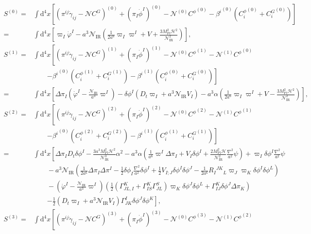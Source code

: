 \documentclass[aps, prd
, preprint
, nofootinbib 
, notitlepage
, longbibliography
]{revtex4-1}
\newcommand{\dd}{\mathrm{d}}
\newcommand{\Mpl}{M_\text{Pl}}
\newcommand{\IR}{\text{IR}}
\newcommand{\calH}{\mathcal{H}}
\newcommand{\calN}{\mathcal{N}}
\newcommand{\dphi}{\delta\phi}
\newcommand{\Dpi}{\Delta\pi}
\newcommand{\bae}[1]{\begin{align} #1 \end{align}}
\begin{document}
\bae{
	S^{(0)} =& \int\dd^4x\left[(\pi^{ij}\dot{\gamma}_{ij}-\calN C^G)^{(0)}+(\pi_I\dot{\phi}^I)^{(0)}-\calN^{(0)}{C^\phi}^{(0)}
	-{\beta^i}^{(0)}({C_i^\phi}^{(0)}+{C_i^G}^{(0)})\right]
	\nonumber \\
	=&\int\dd^4x\left[\varpi_I\dot{\varphi}^I-a^3\calN_\IR\left(\frac{1}{2a^6}\varpi_I\varpi^I+V+\frac{3\Mpl^2\calH^2}{\calN_\IR^2}\right)\right], \\
	S^{(1)} =& \int\dd^4x\left[(\pi^{ij}\dot{\gamma}_{ij}-\calN C^G)^{(1)}+(\pi_I\dot{\phi}^I)^{(1)}-\calN^{(0)}{C^\phi}^{(1)}-\calN^{(1)}{C^\phi}^{(0)} \right. \nonumber \\
	&\qquad \left.-{\beta^i}^{(0)}({C_i^\phi}^{(1)}+{C_i^G}^{(1)})-{\beta^i}^{(1)}({C_i^\phi}^{(0)}+{C_i^G}^{(0)})\right] \nonumber \\
	=&\int\dd^4x\left[\Dpi_I\left(\dot{\varphi}^I-\frac{\calN_\IR}{a^3}\varpi^I\right)-\dphi^I\left(D_t\varpi_I+a^3\calN_\IR V_I\right)
	-a^3\alpha\left(\frac{1}{2a^6}\varpi_I\varpi^I+V-\frac{3\Mpl^2\calH^2}{\calN_\IR^2}\right)\right], \\
	S^{(2)}=&\int\dd^4x\left[(\pi^{ij}\dot{\gamma}_{ij}-\calN C^G)^{(2)}+(\pi_I\dot{\phi}^I)^{(2)}-\calN^{(0)}{C^\phi}^{(2)}-\calN^{(1)}{C^\phi}^{(1)} \right. \nonumber \\
	&\qquad \left. -{\beta^i}^{(0)}({C_i^\phi}^{(2)}+{C_i^G}^{(2)})-{\beta^i}^{(1)}({C_i^\phi}^{(1)}+{C_i^G}^{(1)})\right] \nonumber \\
	=&\int\dd^4x\left[\Dpi_ID_t\dphi^I-\frac{3a^3\Mpl^2\calH^2}{\calN_\IR^3}\alpha^2-a^3\alpha\left(\frac{1}{a^6}\varpi^I\Dpi_I+V_I\dphi^I
	+\frac{2\Mpl^2\calH}{\calN_\IR^2}\frac{\nabla^2}{a^2}\psi\right)+\varpi_I\dphi^I\frac{\nabla^2}{a^2}\psi \right. \nonumber \\
	&\qquad -a^3\calN_\IR\left(\frac{1}{2a^6}\Dpi_I\Dpi^I-\frac{1}{2}\dphi_I\frac{\nabla^2}{a^2}\dphi^I+\frac{1}{2}V_{I;J}\dphi^I\dphi^J
	-\frac{1}{2a^6}R_I{}^{JK}{}_L\varpi_J\varpi_K\dphi^I\dphi^L\right) \nonumber \\
	&\qquad -\left(\dot{\varphi}^I-\frac{\calN_\IR}{a^3}\varpi^I\right)\left(\frac{1}{2}(\Gamma^K_{JL,I}+\Gamma^K_{IS}\Gamma^S_{JL})\varpi_K\dphi^J\dphi^L
	+\Gamma_{IJ}^K\dphi^J\Dpi_K\right) \nonumber \\
	&\qquad \left.-\frac{1}{2}\left(D_t\varpi_I+a^3\calN_\IR V_I\right)\Gamma^I_{JK}\dphi^J\dphi^K\right], \\
	S^{(3)}=&\int\dd^4x\left[(\pi^{ij}\dot{\gamma}_{ij}-\calN C^G)^{(3)}+(\pi_I\dot{\phi}^I)^{(3)}-\calN^{(0)}{C^\phi}^{(3)}-\calN^{(1)}{C^\phi}^{(2)} \right. \nonumber \\
}
\end{document}
